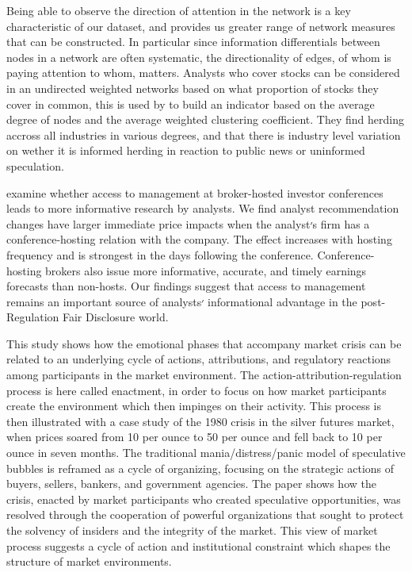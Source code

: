 Being able to observe the direction of attention in the network is a key characteristic of our dataset, and provides us greater range of network measures that can be constructed.
In particular since information differentials between nodes in a network are often systematic, the directionality of edges, of whom is paying attention to whom, matters.
Analysts who cover stocks can be considered in an undirected weighted networks based on what proportion of stocks they cover in common, this is used by  \cite{zhao2014analysis} to build an indicator based on the average degree of nodes and the average weighted clustering coefficient. 
They find herding accross all industries in various degrees, and that there is industry level variation on wether it is informed herding in reaction to public news or uninformed speculation.

\cite{green2014access} examine whether access to management at broker-hosted investor conferences leads to more informative research by analysts. We find analyst recommendation changes have larger immediate price impacts when the analyst׳s firm has a conference-hosting relation with the company. The effect increases with hosting frequency and is strongest in the days following the conference. Conference-hosting brokers also issue more informative, accurate, and timely earnings forecasts than non-hosts. Our findings suggest that access to management remains an important source of analysts׳ informational advantage in the post-Regulation Fair Disclosure world.


\cite{abolafia1988enacting}
This study shows how the emotional phases that accompany market crisis can be related to an underlying cycle of actions, attributions, and regulatory reactions among participants in the market environment. The action-attribution-regulation process is here called enactment, in order to focus on how market participants create the environment which then impinges on their activity. This process is then illustrated with a case study of the 1980 crisis in the silver futures market, when prices soared from 10 per ounce to 50 per ounce and fell back to 10 per ounce in seven months. The traditional mania/distress/panic model of speculative bubbles is reframed as a cycle of organizing, focusing on the strategic actions of buyers, sellers, bankers, and government agencies. The paper shows how the crisis, enacted by market participants who created speculative opportunities, was resolved through the cooperation of powerful organizations that sought to protect the solvency of insiders and the integrity of the market. This view of market process suggests a cycle of action and institutional constraint which shapes the structure of market environments.

